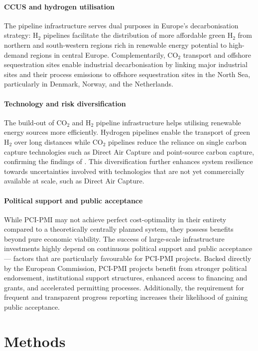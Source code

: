 \documentclass[pdflatex,sn-nature]{sn-jnl}%
\theoremstyle{thmstyleone}%
\theoremstyle{thmstyletwo}%
\theoremstyle{thmstylethree}%
\begin{document}
\paragraph{CCUS and hydrogen utilisation}
The pipeline infrastructure serves dual purposes in Europe's decarbonisation strategy: H$_2$ pipelines facilitate the distribution of more affordable green H$_2$ from northern and south-western regions rich in renewable energy potential to high-demand regions in central Europe. Complementarily, CO$_2$ transport and offshore sequestration sites enable industrial decarbonisation by linking major industrial sites and their process emissions to offshore sequestration sites in the North Sea, particularly in Denmark, Norway, and the Netherlands.

\paragraph{Technology and risk diversification}
The build-out of CO$_2$ and H$_2$ pipeline infrastructure helps utilising renewable energy sources more efficiently. Hydrogen pipelines enable the transport of green H$_2$ over long distances while CO$_2$ pipelines reduce the reliance on single carbon capture technologies such as Direct Air Capture and point-source carbon capture, confirming the findings of \cite{hofmannH2CO2Network2025}. This diversification further enhances system resilience towards uncertainties involved with technologies that are not yet commercially available at scale, such as Direct Air Capture.

\paragraph{Political support and public acceptance} 
While PCI-PMI may not achieve perfect cost-optimality in their entirety compared to a theoretically centrally planned system, they possess benefits beyond pure economic viability. The success of large-scale infrastructure investments highly depend on continuous political support and public acceptance --- factors that are particularly favourable for PCI-PMI projects.
Backed directly by the European Commission, PCI-PMI projects benefit from stronger political endorsement, institutional support structures, enhanced access to financing and grants, and accelerated permitting processes. Additionally, the requirement for frequent and transparent progress reporting increases their likelihood of gaining public acceptance.

\section*{Methods}\label{sec:methods}
\end{document}
